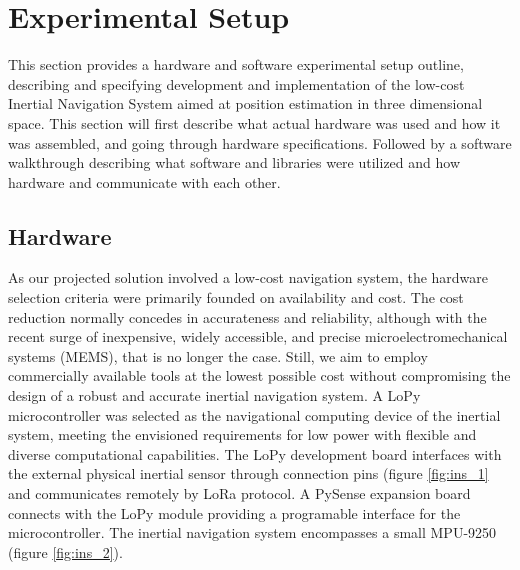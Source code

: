 \section{Experimental Setup}

This section provides a hardware and software experimental setup outline, describing and specifying development and implementation of the low-cost Inertial Navigation System aimed at position estimation in three dimensional space. This section will first describe what actual hardware was used and how it was assembled, and going through hardware specifications. Followed by a software walkthrough describing what software and libraries were utilized and how hardware and communicate with each other.


\subsection{Hardware}

As our projected solution involved a low-cost navigation system, the hardware selection criteria were primarily founded on availability and cost. The cost reduction normally concedes in accurateness and reliability, although with the recent surge of inexpensive, widely accessible, and precise microelectromechanical systems (MEMS), that is no longer the case. Still, we aim to employ commercially available tools at the lowest possible cost without compromising the design of a robust and accurate inertial navigation system. A LoPy microcontroller was selected as the navigational computing device of the inertial system, meeting the envisioned requirements for low power with flexible and diverse computational capabilities. The LoPy development board interfaces with the external physical inertial sensor through connection pins (figure \ref{fig:ins_1} and communicates remotely by LoRa protocol. A PySense expansion board connects with the LoPy module providing a programable interface for the microcontroller. The inertial navigation system encompasses a small MPU-9250 (figure \ref{fig:ins_2}).

